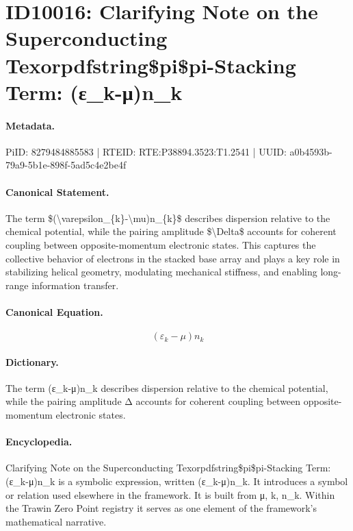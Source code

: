 \section*{ID10016: Clarifying Note on the Superconducting Texorpdfstring\$pi\$pi-Stacking Term: (ε\_k-μ)n\_k}
\paragraph{Metadata.}
PiID: 8279484885583 | RTEID: RTE:P38894.3523:T1.2541 | UUID: a0b4593b-79a9-5b1e-898f-5ad5c4e2be4f

\paragraph{Canonical Statement.}
The term \$(\textbackslash{}varepsilon\_\{k\}-\textbackslash{}mu)n\_\{k\}\$ describes dispersion relative to the chemical potential, while the pairing amplitude \$\textbackslash{}Delta\$ accounts for coherent coupling between opposite-momentum electronic states. This captures the collective behavior of electrons in the stacked base array and plays a key role in stabilizing helical geometry, modulating mechanical stiffness, and enabling long-range information transfer.

\paragraph{Canonical Equation.}
\[
(\varepsilon_{k}-\mu)n_{k}
\]

\paragraph{Dictionary.}
The term (ε\_k-μ)n\_k describes dispersion relative to the chemical potential, while the pairing amplitude Δ accounts for coherent coupling between opposite-momentum electronic states.

\paragraph{Encyclopedia.}
Clarifying Note on the Superconducting Texorpdfstring\$pi\$pi-Stacking Term: (ε\_k-μ)n\_k is a symbolic expression, written (ε\_k-μ)n\_k. It introduces a symbol or relation used elsewhere in the framework. It is built from μ, k, n\_k. Within the Trawin Zero Point registry it serves as one element of the framework's mathematical narrative.
